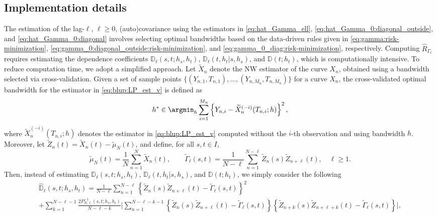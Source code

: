\subsection{Implementation details}
The estimation of the lag-$\ell$, $\ell \geq 0$, (auto)covariance using the estimators in \eqref{eq:hat_Gamma_ell}, \eqref{eq:hat_Gamma_0:diagonal_outside}, and \eqref{eq:hat_Gamma_0:diagonal} involves selecting optimal bandwidths based on the data-driven rules given in \eqref{eq:gamma:risk-minimization}, \eqref{eq:gamma_0:diagonal_outside:risk-minimization}, and \eqref{eq:gamma_0_diag:risk-minimization}, respectively. Computing $\widehat{R}_{\Gamma_\ell}$ requires estimating the dependence coefficients $\mathbb{D}_\ell(s, t; h_s, h_t)$, $\mathbb{D}_\ell(t,h_t|s,h_s)$, and $\mathbb{D}(t; h_t)$, which is computationally intensive.
To reduce computation time, we adopt a simplified approach. Let $\widetilde{X}_n$ denote the NW estimator of the curve $X_n$, obtained using a bandwidth selected via cross-validation. Given a set of sample points $\{(Y_{n,1}, T_{n,1}), \ldots, (Y_{n,M_n}, T_{n,M_n})\}$ for a curve $X_n$, the cross-validated optimal bandwidth for the estimator in \eqref{eq:blup:LP_est_v} is defined as
\begin{equation}\label{eq:NW_bw_cv}
	h^* \in \argmin_h \sum_{i = 1}^{M_n}\left\{Y_{n,i} - \widetilde{X}_n^{(-i)}(T_{n,i};h)\right\}^2,
\end{equation}
where $\widetilde{X}_n^{(-i)}(T_{n,i};h)$ denotes the estimator in \eqref{eq:blup:LP_est_v} computed without the $i$-th observation and using bandwidth $h$. Moreover, let $\widetilde{Z}_n(t) = \widetilde{X}_n(t) - \widetilde{\mu}_N(t)$, and define, for all $s, t \in I$,
\begin{equation*}
	\widetilde{\mu}_N(t) = \frac{1}{N} \sum_{n=1}^{N} \widetilde{X}_{n}(t), \qquad
	\widetilde{\Gamma}_\ell(s, t) = \frac{1}{N - \ell} \sum_{n = 1}^{N - \ell} \widetilde{Z}_n(s) \widetilde{Z}_{n + \ell}(t), \quad \ell \geq 1.
\end{equation*}
Then, instead of estimating $\mathbb{D}_\ell(s, t; h_s, h_t)$, $\mathbb{D}_\ell(t,h_t|s,h_s)$, and $\mathbb{D}(t; h_t)$, we simply consider the following 
\begin{multline}
	\widehat{\mathbb{D}}_\ell(s,t;h_s, h_t) 
	= \frac{1}{N-\ell} \sum_{n=1}^{N - \ell} \left\{\widetilde{Z}_n(s) \widetilde{Z}_{n + \ell}(t) - \widetilde{\Gamma}_\ell (s,t)\right\}^2 \\
	+ \!\!\!\!\sum_{k = 1}^{N-\ell - 1}\frac{2 P_{N,\ell}^{-1}(s, t; h_s, h_t)}{N - \ell - k} \Biggl|\sum_{n = 1}^{N - \ell - k - 1}\!\left\{\widetilde{Z}_n(s) \widetilde{Z}_{n + \ell}(t) - \widetilde{\Gamma}_\ell (s,t)\right\} \left\{\widetilde{Z}_{n + k}(s) \widetilde{Z}_{n + \ell + k}(t) - \widetilde{\Gamma}_\ell (s,t)\right\}\!\Biggr|,
\end{multline}
